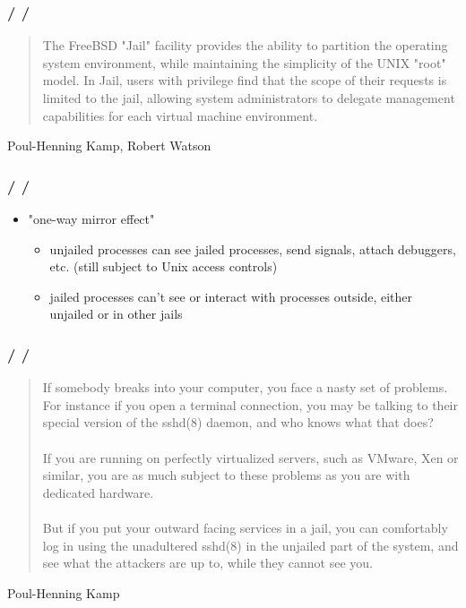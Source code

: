 \documentclass{beamer}
\newcommand{\autotitle}
{\frametitle{
    \secname
    \ifx\insertsubsection\empty
    \else
        /\subsecname
        \ifx\insertsubsubsection\empty\else/\subsubsecname\fi
    \fi}}
\begin{document}
\begin{frame}
    \autotitle
    \begin{quote}
        The FreeBSD "Jail" facility provides the ability to partition the
        operating system environment, while maintaining the simplicity of the
        UNIX "root" model.  In Jail, users with privilege find that the scope
        of their requests is limited to the jail, allowing system
        administrators to delegate management capabilities for each virtual
        machine environment.
    \end{quote}
    Poul-Henning Kamp, Robert Watson \cite{kamp_jails}
\end{frame}

\begin{frame}
    \autotitle
    \begin{itemize}
        \item "one-way mirror effect"
        \begin{itemize}
            \item
                unjailed processes can see jailed processes, send signals,
                attach debuggers, etc. (still subject to Unix access controls)
            \item
                jailed processes can't see or interact with processes outside,
                either unjailed or in other jails
        \end{itemize}
    \end{itemize}
\end{frame}

\begin{frame}
    \autotitle
    \begin{quote}
        If somebody breaks into your computer, you face a nasty set of
        problems. For instance if you open a terminal connection, you may be
        talking to their special version of the sshd(8) daemon, and who knows
        what that does?
        \\~\\
        If you are running on perfectly virtualized servers, such as VMware,
        Xen or similar, you are as much subject to these problems as you are
        with dedicated hardware.
        \\~\\
        But if you put your outward facing services in a jail, you can
        comfortably log in using the unadultered sshd(8) in the unjailed part
        of the system, and see what the attackers are up to, while they cannot
        see you.
    \end{quote}
    Poul-Henning Kamp \cite{kamp_sagas_jails}
\end{frame}
\end{document}
